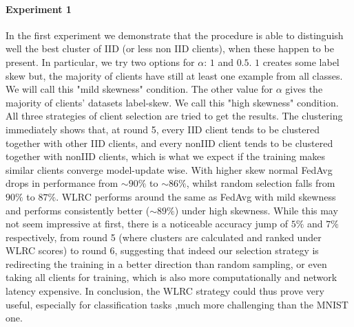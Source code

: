 \documentclass{article}
\begin{document}
\paragraph{Experiment 1}
In the first experiment we demonstrate that the procedure is able to distinguish well the best cluster of IID (or less non IID clients), when these happen to be present. In particular, we try two options for $\alpha$: $1$ and $0.5$. $1$ creates some label skew but, the majority of clients have still at least one example from all classes. We will call this "mild skewness" condition. The other value for $\alpha$ gives the majority of clients' datasets label-skew. We call this "high skewness" condition. All three strategies of client selection are tried to get the results. 
The clustering immediately shows that, at round 5, every IID client tends to be clustered together with other IID clients, and every nonIID client tends to be clustered together with nonIID clients, which is what we expect if the training makes similar clients converge model-update wise. 
With higher skew normal FedAvg drops in performance from $\sim 90\%$ to $\sim 86\%$, whilst random selection falls from $90\%$ to $87\%$. 
WLRC performs around the same as FedAvg with mild skewness and performs consistently better ($\sim 89\%$) under high skewness. While this may not seem impressive at first, there is a noticeable accuracy jump of $5\%$ and $7\%$ respectively, from round 5 (where clusters are calculated and ranked under WLRC scores) to round 6, suggesting that indeed our selection strategy is redirecting the training in a better direction than random sampling, or even taking all clients for training, which is also more computationally and network latency expensive. 
In conclusion, the WLRC strategy could thus prove very useful, especially for classification tasks ,much more challenging than the MNIST one.
\end{document}
